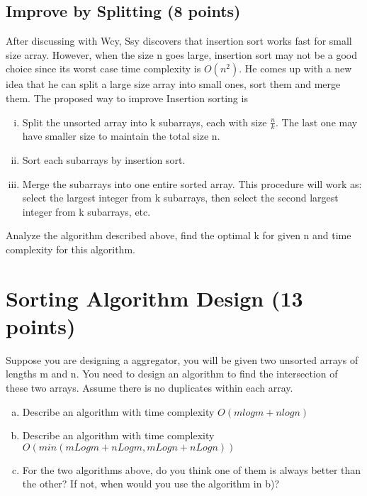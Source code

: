 \documentclass[11pt]{exam}
\begin{document}
\subsection{Improve by Splitting (8 points)}
After discussing with Wcy, Ssy discovers that insertion sort works fast for small size array. However, when the size n goes large, insertion sort may not be a good choice since its worst case time complexity is $O(n^2)$. He comes up with a new idea that he can split a large size array into small ones, sort them and merge them. The proposed way to improve Insertion sorting is
\begin{enumerate}[i)]
    \item Split the unsorted array into k subarrays, each with size $\frac{n}{k}$. The last one may have smaller size to maintain the total size n.
    \item Sort each subarrays by insertion sort.
    \item Merge the subarrays into one entire sorted array. This procedure will work as: select the largest integer from k subarrays, then select the second largest integer from k subarrays, etc.
\end{enumerate}
Analyze the algorithm described above, find the optimal k for given n and time complexity for this algorithm.

\begin{solution}
\end{solution}

\section{Sorting Algorithm Design (13 points)}
Suppose you are designing a aggregator, you will be given two unsorted arrays of lengths m and n. You need to design an algorithm to find the intersection of these two arrays. Assume there is no duplicates within each array.
\begin{enumerate}[a)]
    \item Describe an algorithm with time complexity $O(m log m + n log n)$
    \item Describe an algorithm with time complexity $O(min(mLogm + nLogm, mLogn + nLogn))$
    \item For the two algorithms above, do you think one of them is always better than the other? If not, when would you use the algorithm in b)?
\end{enumerate}

\newpage
\begin{solution}
\end{solution}
\end{document}
